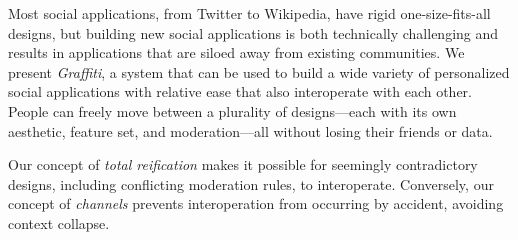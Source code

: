 




Most social applications, from Twitter to Wikipedia,
have rigid one-size-fits-all designs, but building new social applications
is both technically challenging and results in
applications that are siloed away from existing communities.
We present \emph{Graffiti}, a system that can be used
to build a wide variety of personalized social applications
with relative ease that also interoperate with each other. People can freely move between
a plurality of designs---each with its own aesthetic, feature set,
and moderation---all without losing their friends or data.

Our concept of \emph{total reification} makes it possible
for seemingly contradictory designs, including conflicting
moderation rules, to interoperate.
Conversely, our concept of \emph{channels}
prevents interoperation from occurring by accident, avoiding context collapse.


